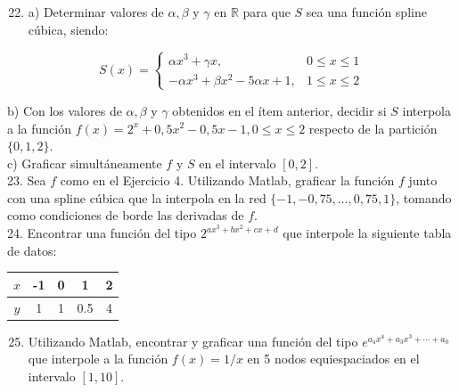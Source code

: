 \documentclass[10pt]{book}
\begin{document}
\begin{enumerate}
  \setcounter{enumi}{21}
  \item a) Determinar valores de $\alpha, \beta$ y $\gamma$ en $\mathbb{R}$ para que $S$ sea una función spline cúbica, siendo:
\end{enumerate}

$$
S(x)= \begin{cases}\alpha x^{3}+\gamma x, & 0 \leq x \leq 1 \\ -\alpha x^{3}+\beta x^{2}-5 \alpha x+1, & 1 \leq x \leq 2\end{cases}
$$

b) Con los valores de $\alpha, \beta$ y $\gamma$ obtenidos en el ítem anterior, decidir si $S$ interpola a la función $f(x)=2^{x}+0,5 x^{2}-0,5 x-1,0 \leq x \leq 2$ respecto de la partición $\{0,1,2\}$.\\
c) Graficar simultáneamente $f$ y $S$ en el intervalo $[0,2]$.\\
23. Sea $f$ como en el Ejercicio 4. Utilizando Matlab, graficar la función $f$ junto con una spline cúbica que la interpola en la red $\{-1,-0,75, \ldots, 0,75,1\}$, tomando como condiciones de borde las derivadas de $f$.\\
24. Encontrar una función del tipo $2^{a x^{3}+b x^{2}+c x+d}$ que interpole la siguiente tabla de datos:

\begin{center}
\begin{tabular}{|c|c|c|c|c|}
\hline
$x$ & -1 & 0 & 1 & 2 \\
\hline
$y$ & 1 & 1 & 0.5 & 4 \\
\hline
\end{tabular}
\end{center}

\begin{enumerate}
  \setcounter{enumi}{24}
  \item Utilizando Matlab, encontrar y graficar una función del tipo $e^{a_{4} x^{4}+a_{3} x^{3}+\cdots+a_{0}}$ que interpole a la función $f(x)=1 / x$ en 5 nodos equiespaciados en el intervalo $[1,10]$.
\end{enumerate}
\end{document}
